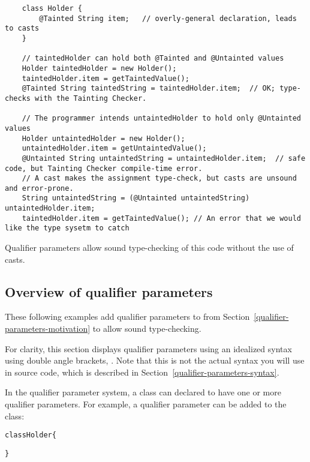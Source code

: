 \begin{smaller}
\begin{Verbatim}
    class Holder {
        @Tainted String item;   // overly-general declaration, leads to casts
    }

    // taintedHolder can hold both @Tainted and @Untainted values
    Holder taintedHolder = new Holder();
    taintedHolder.item = getTaintedValue();
    @Tainted String taintedString = taintedHolder.item;  // OK; type-checks with the Tainting Checker.

    // The programmer intends untaintedHolder to hold only @Untainted values
    Holder untaintedHolder = new Holder();
    untaintedHolder.item = getUntaintedValue();
    @Untainted String untaintedString = untaintedHolder.item;  // safe code, but Tainting Checker compile-time error.
    // A cast makes the assignment type-check, but casts are unsound and error-prone.
    String untaintedString = (@Untainted untaintedString) untaintedHolder.item;
    taintedHolder.item = getTaintedValue(); // An error that we would like the type sysetm to catch
\end{Verbatim}
\end{smaller}

Qualifier parameters allow sound type-checking of this
code without the use of casts.


\subsection{Overview of qualifier parameters\label{qualifier-parameters-overview}}

These following examples add qualifier parameters to
 from Section~\ref{qualifier-parameters-motivation} to allow
sound type-checking.

For clarity, this section displays qualifier parameters using an idealized
syntax using double angle brackets, .
Note that this is not the actual
syntax you will use in source code, which is described in
Section~\ref{qualifier-parameters-syntax}.

In the qualifier parameter system, a class can declared to have one or more
qualifier parameters. For example, a qualifier parameter can be added to the
 class:

\begin{alltt}
    class Holder  \{

    \}
\end{alltt}

